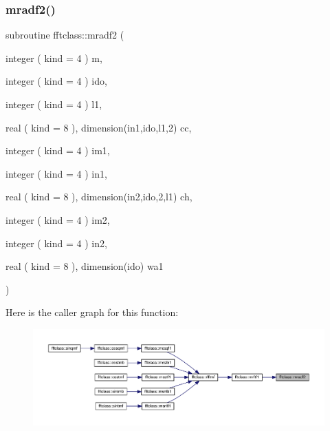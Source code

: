 \subsubsection{\texorpdfstring{mradf2()}{mradf2()}}
{\footnotesize\ttfamily subroutine fftclass\+::mradf2 (\begin{DoxyParamCaption}\item[{integer ( kind = 4 )}]{m,  }\item[{integer ( kind = 4 )}]{ido,  }\item[{integer ( kind = 4 )}]{l1,  }\item[{real ( kind = 8 ), dimension(in1,ido,l1,2)}]{cc,  }\item[{integer ( kind = 4 )}]{im1,  }\item[{integer ( kind = 4 )}]{in1,  }\item[{real ( kind = 8 ), dimension(in2,ido,2,l1)}]{ch,  }\item[{integer ( kind = 4 )}]{im2,  }\item[{integer ( kind = 4 )}]{in2,  }\item[{real ( kind = 8 ), dimension(ido)}]{wa1 }\end{DoxyParamCaption})}

Here is the caller graph for this function\+:\nopagebreak
\begin{figure}[H]
\begin{center}
\leavevmode
\includegraphics[width=350pt]{namespacefftclass_a577b893eadc27ccc53b888490cb1b873_icgraph}
\end{center}
\end{figure}
\mbox{\label{namespacefftclass_a4e99b7194e96b9a086f743a98205cc5a}} 
